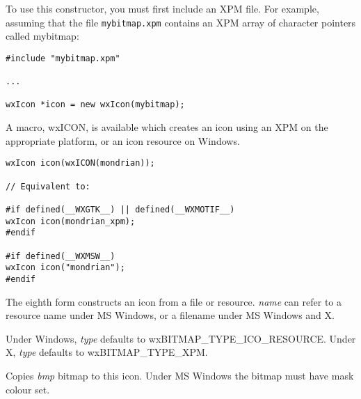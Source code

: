 To use this constructor, you must first include an XPM file. For
example, assuming that the file {\tt mybitmap.xpm} contains an XPM array
of character pointers called mybitmap:

\begin{verbatim}
#include "mybitmap.xpm"

...

wxIcon *icon = new wxIcon(mybitmap);
\end{verbatim}

A macro, wxICON, is available which creates an icon using an XPM
on the appropriate platform, or an icon resource on Windows.

\begin{verbatim}
wxIcon icon(wxICON(mondrian));

// Equivalent to:

#if defined(__WXGTK__) || defined(__WXMOTIF__)
wxIcon icon(mondrian_xpm);
#endif

#if defined(__WXMSW__)
wxIcon icon("mondrian");
#endif
\end{verbatim}

The eighth form constructs an icon from a file or resource. {\it name} can refer
to a resource name under MS Windows, or a filename under MS Windows and X.

Under Windows, {\it type} defaults to wxBITMAP\_TYPE\_ICO\_RESOURCE.
Under X, {\it type} defaults to wxBITMAP\_TYPE\_XPM.



\label{wxiconcopyfrombitmap}


Copies {\it bmp} bitmap to this icon. Under MS Windows the bitmap
must have mask colour set.




